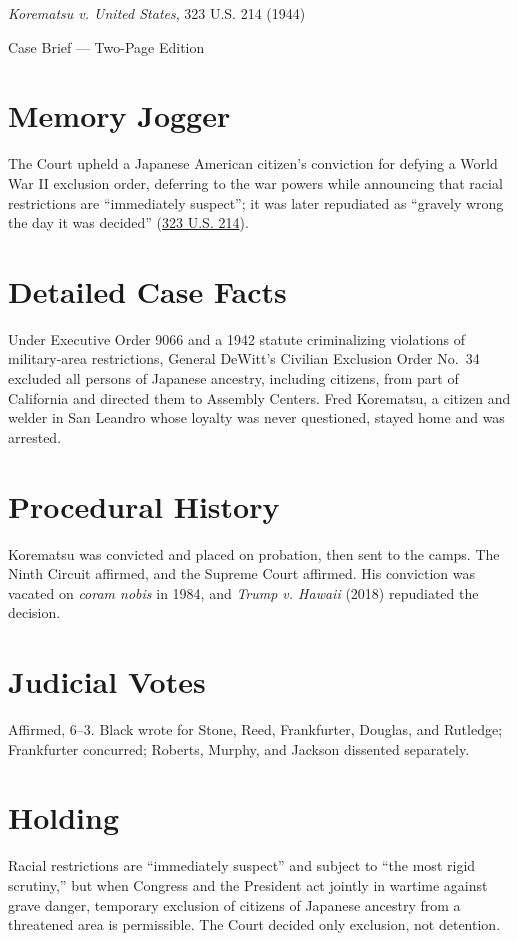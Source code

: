 \documentclass[12pt]{article}
\begin{document}
\begin{center}
{\LARGE \textit{Korematsu v. United States}, 323 U.S. 214 (1944)\par}
\vspace{0.5em}
{\large Case Brief --- Two-Page Edition\par}
\end{center}

\section{Memory Jogger}
The Court upheld a Japanese American citizen's conviction for defying a World War II exclusion order, deferring to the war powers while announcing that racial restrictions are ``immediately suspect''; it was later repudiated as ``gravely wrong the day it was decided'' (\href{https://www.courtlistener.com/opinion/104040/korematsu-v-united-states/}{323 U.S. 214}).

\section{Detailed Case Facts}
Under Executive Order 9066 and a 1942 statute criminalizing violations of military-area restrictions, General DeWitt's Civilian Exclusion Order No.~34 excluded all persons of Japanese ancestry, including citizens, from part of California and directed them to Assembly Centers. Fred Korematsu, a citizen and welder in San Leandro whose loyalty was never questioned, stayed home and was arrested.

\section{Procedural History}
Korematsu was convicted and placed on probation, then sent to the camps. The Ninth Circuit affirmed, and the Supreme Court affirmed. His conviction was vacated on \textit{coram nobis} in 1984, and \textit{Trump v. Hawaii} (2018) repudiated the decision.

\section{Judicial Votes}
Affirmed, 6--3. Black wrote for Stone, Reed, Frankfurter, Douglas, and Rutledge; Frankfurter concurred; Roberts, Murphy, and Jackson dissented separately.

\section{Holding}
Racial restrictions are ``immediately suspect'' and subject to ``the most rigid scrutiny,'' but when Congress and the President act jointly in wartime against grave danger, temporary exclusion of citizens of Japanese ancestry from a threatened area is permissible. The Court decided only exclusion, not detention.
\end{document}

